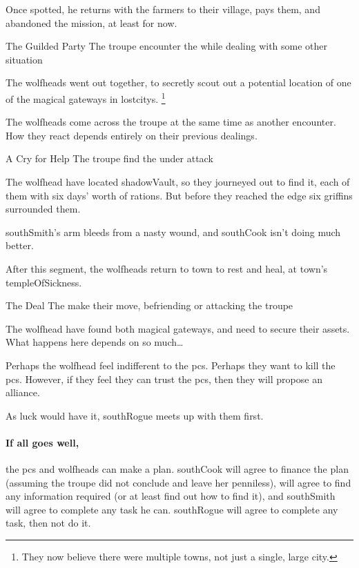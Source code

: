 Once spotted, he returns with the farmers to their \gls{village}, pays them, and abandoned the mission, at least for now.

{The Guilded Party}%
{The troupe encounter the  while dealing with some other situation}%

\begin{exampletext}
  The \glspl{wolfhead} went out together, to secretly scout out a potential location of one of the magical gateways in \glspl{lostcity}.%
  \footnote{They now believe there were multiple towns, not just a single, large city.}
\end{exampletext}

The \glspl{wolfhead} come across the troupe at the same time as another encounter.
How they react depends entirely on their previous dealings.

{A Cry for Help}%
{The troupe find the  under attack}%

The \gls{wolfhead} have located \gls{shadowVault}, so they journeyed out to find it, each of them with six days' worth of \glspl{ration}.
But before they reached the \gls{edge} six griffins surrounded them.

\Gls{southSmith}'s arm bleeds from a nasty wound, and \gls{southCook} isn't doing much better.

\setcounter{wounds}{3}
\southCook

After this \gls{segment}, the \glspl{wolfhead} return to \gls{town} to rest and heal, at \gls{town}'s \gls{templeOfSickness}.


{The Deal}%
{The  make their move, befriending or attacking the troupe}%

The \gls{wolfhead} have found both magical gateways, and need to secure their assets.
What happens here depends on so much\ldots

Perhaps the \gls{wolfhead} feel indifferent to the \glspl{pc}.
Perhaps they want to kill the \glspl{pc}.
However, if they feel they can trust the \glspl{pc}, then they will propose an alliance.

As luck would have it, \gls{southRogue} meets up with them first.

\paragraph{If all goes well,}
the \glspl{pc} and \glspl{wolfhead} can make a plan.
\Gls{southCook} will agree to finance the plan (assuming the troupe did not conclude  and leave her penniless),  will agree to find any information required (or at least find out how to find it), and \gls{southSmith} will agree to complete any task he can.
\Gls{southRogue} will agree to complete any task, then not do it.

